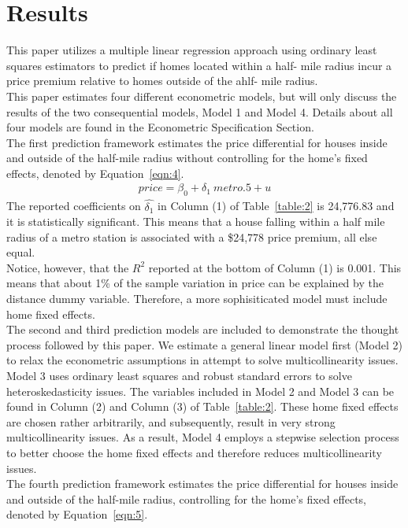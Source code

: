 \documentclass[12pt]{report}
\newcommand\tab[1][.50cm]{\hspace*{#1}}
\begin{document}
\section*{Results}
This paper utilizes a multiple linear regression approach using ordinary least squares estimators to predict if homes located within a half- mile radius incur a price premium relative to homes outside of the ahlf- mile radius.\\
\tab This paper estimates four different econometric models, but will only discuss the results of the two consequential models, Model 1 and Model 4. Details about all four models are found in the Econometric Specification Section.\\
\tab The first prediction framework estimates the price differential for houses inside and outside of the half-mile radius without controlling for the home's fixed effects, denoted by Equation~\ref{eqn:4}.
\begin{align}
\ price = \beta_0 +\delta_1\ metro.5  + u \ 
\label{eqn:4}
\end{align}
The reported coefficients on $\hat{\delta_1}$  in Column (1) of Table~\ref{table:2} is 24,776.83 and it is statistically significant. This means that a house falling within a half mile radius of a metro station is associated with a \$24,778 price premium, all else equal.\\
\tab Notice, however, that the $R^2$ reported at the bottom of Column (1) is 0.001. This means that about 1\% of the sample variation in price can be explained by the distance dummy variable. Therefore, a more sophisiticated model must include home fixed effects.\\
\tab The second and third prediction models are included to demonstrate the thought process followed by this paper. We estimate a general linear model first (Model 2) to relax the econometric assumptions in attempt to solve multicollinearity issues. Model 3 uses ordinary least squares and robust standard errors to solve heteroskedasticity issues. The variables included in Model 2 and Model 3 can be found in Column (2) and Column (3) of Table~\ref{table:2}. These home fixed effects are chosen rather arbitrarily, and subsequently, result in very strong multicollinearity issues. As a result, Model 4 employs a stepwise selection process to better choose the home fixed effects and therefore reduces multicollinearity issues. \\
\tab The fourth prediction framework estimates the price differential for houses inside and outside of the half-mile radius, controlling for the home's fixed effects, denoted by Equation~\ref{eqn:5}.
\end{document}
